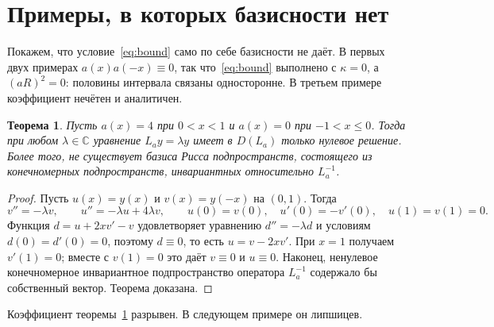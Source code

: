 \documentclass[12pt,a4paper]{article}
\newtheorem{theorem}{Теорема}
\theoremstyle{definition}
\renewcommand{\C}{\mathbb C}
\begin{document}
\section{Примеры, в которых базисности нет}\label{sec:examples}
Покажем, что условие~\eqref{eq:bound} само по себе базисности не даёт. В первых двух
примерах $a(x)a(-x)\equiv0$, так что~\eqref{eq:bound} выполнено с $\kappa=0$, а
$(aR)^2=0$: половины интервала связаны односторонне. В третьем примере коэффициент
нечётен и аналитичен.

\begin{theorem}\label{th:onesided}
Пусть $a(x)=4$ при $0<x<1$ и $a(x)=0$ при $-1<x\le0$. Тогда при любом $\lambda\in\C$
уравнение $L_ay=\lambda y$ имеет в $D(L_a)$ только нулевое решение. Более того, не
существует базиса Рисса подпространств, состоящего из конечномерных подпространств,
инвариантных относительно $L_a^{-1}$.
\end{theorem}
\begin{proof}
Пусть $u(x)=y(x)$ и $v(x)=y(-x)$ на $(0,1)$. Тогда
\[
 v''=-\lambda v,\qquad u''=-\lambda u+4\lambda v,\qquad
 u(0)=v(0),\quad u'(0)=-v'(0),\quad u(1)=v(1)=0 .
\]
Функция $d=u+2xv'-v$ удовлетворяет уравнению $d''=-\lambda d$ и условиям
$d(0)=d'(0)=0$, поэтому $d\equiv0$, то есть $u=v-2xv'$. При $x=1$ получаем $v'(1)=0$;
вместе с $v(1)=0$ это даёт $v\equiv0$ и $u\equiv0$. Наконец, ненулевое конечномерное
инвариантное подпространство оператора $L_a^{-1}$ содержало бы собственный вектор.
Теорема доказана.
\end{proof}
Коэффициент теоремы~\ref{th:onesided} разрывен. В следующем примере он липшицев.
\end{document}
